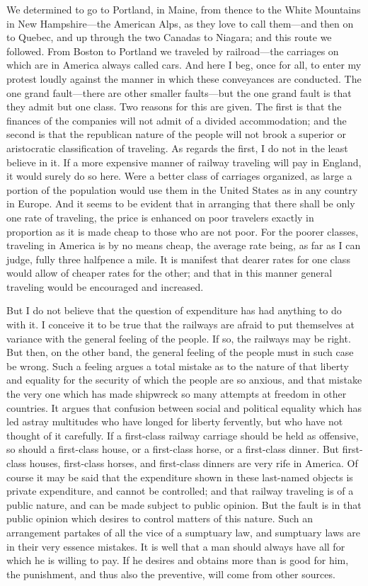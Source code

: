 We determined to go to Portland, in Maine, from thence to the White
Mountains in New Hampshire---the American Alps, as they love to call
them---and then on to Quebec, and up through the two Canadas to
Niagara; and this route we followed.  From Boston to Portland we
traveled by railroad---the carriages on which are in America always
called cars.  And here I beg, once for all, to enter my protest
loudly against the manner in which these conveyances are conducted.
The one grand fault---there are other smaller faults---but the one
grand fault is that they admit but one class.  Two reasons for this
are given.  The first is that the finances of the companies will
not admit of a divided accommodation; and the second is that the
republican nature of the people will not brook a superior or
aristocratic classification of traveling.  As regards the first, I
do not in the least believe in it.  If a more expensive manner of
railway traveling will pay in England, it would surely do so here.
Were a better class of carriages organized, as large a portion of
the population would use them in the United States as in any
country in Europe.  And it seems to be evident that in arranging
that there shall be only one rate of traveling, the price is
enhanced on poor travelers exactly in proportion as it is made
cheap to those who are not poor.  For the poorer classes, traveling
in America is by no means cheap, the average rate being, as far as
I can judge, fully three halfpence a mile.  It is manifest that
dearer rates for one class would allow of cheaper rates for the
other; and that in this manner general traveling would be
encouraged and increased.

But I do not believe that the question of expenditure has had
anything to do with it.  I conceive it to be true that the railways
are afraid to put themselves at variance with the general feeling
of the people.  If so, the railways may be right.  But then, on the
other band, the general feeling of the people must in such case be
wrong.  Such a feeling argues a total mistake as to the nature of
that liberty and equality for the security of which the people are
so anxious, and that mistake the very one which has made shipwreck
so many attempts at freedom in other countries.  It argues that
confusion between social and political equality which has led
astray multitudes who have longed for liberty fervently, but who
have not thought of it carefully.  If a first-class railway
carriage should be held as offensive, so should a first-class
house, or a first-class horse, or a first-class dinner.  But first-
class houses, first-class horses, and first-class dinners are very
rife in America.  Of course it may be said that the expenditure
shown in these last-named objects is private expenditure, and
cannot be controlled; and that railway traveling is of a public
nature, and can be made subject to public opinion.  But the fault
is in that public opinion which desires to control matters of this
nature.  Such an arrangement partakes of all the vice of a
sumptuary law, and sumptuary laws are in their very essence
mistakes.  It is well that a man should always have all for which
he is willing to pay.  If he desires and obtains more than is good
for him, the punishment, and thus also the preventive, will come
from other sources.

